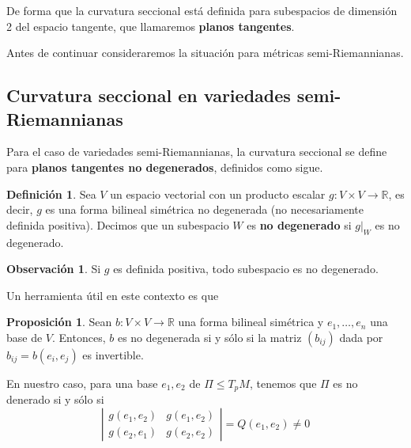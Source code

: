 \documentclass[spanish]{book}
\theoremstyle{definition}
\newtheorem*{defn}{Definición}
\newtheorem*{prop}{Proposición}
\newtheorem*{obs}{Observación}
\newcommand{\R}{\mathbb{R}}
\begin{document}
	De forma que la curvatura seccional está definida para subespacios de dimensión 2 del espacio tangente, que llamaremos \textbf{planos tangentes}.
	
	Antes de continuar consideraremos la situación para métricas semi-Riemannianas.
	
	\subsection{Curvatura seccional en variedades semi-Riemannianas}
	Para el caso de variedades semi-Riemannianas, la curvatura seccional se define para \textbf{planos tangentes no degenerados}, definidos como sigue. 
	
	\begin{defn}
		Sea $V$ un espacio vectorial con un producto escalar $g:V\times V\to \R$, es decir, $g$ es una forma bilineal simétrica no degenerada (no necesariamente definida positiva). Decimos que un subespacio $W$ es \textbf{no degenerado} si $g|_W$ es no degenerado.
	\end{defn}
	\begin{obs}
		Si $g$ es definida positiva, todo subespacio es no degenerado.
	\end{obs}
	Un herramienta útil en este contexto es que
	\begin{prop}
		Sean $b:V\times V\to \R$ una forma bilineal simétrica y $e_1,\ldots,e_n$ una base de $V$. Entonces, $b$ es no degenerada si y sólo si la matriz $(b_{ij})$ dada por $b_{ij}=b(e_i,e_j)$ es invertible.
	\end{prop}
	En nuestro caso, para una base $e_1,e_2$ de $\Pi\leq T_pM$, tenemos que $\Pi$ es no denerado si y sólo si
	\[\left|\begin{matrix}
		g(e_1,e_2)&g(e_1,e_2)\\
		g(e_2,e_1)&g(e_2,e_2)
	\end{matrix}\right|=Q(e_1,e_2)\neq0\]
	
\end{document}
